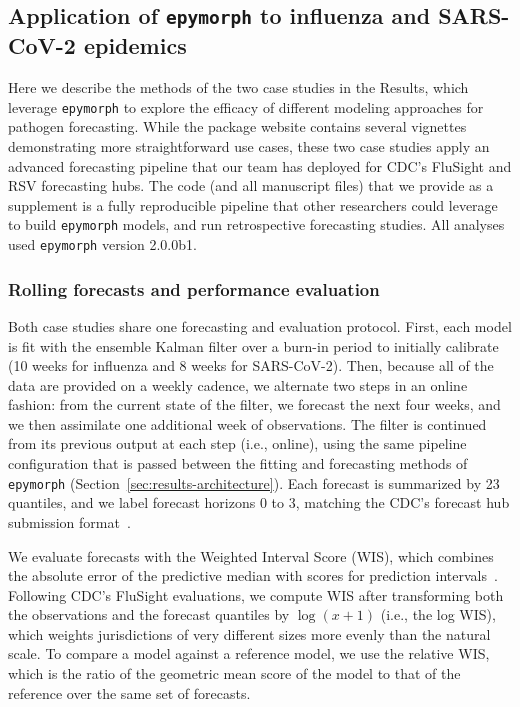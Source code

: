 \subsection{Application of \texttt{epymorph} to influenza and SARS-CoV-2 epidemics}\label{sec:methods-application}

Here we describe the methods of the two case studies in the Results, which leverage \texttt{epymorph} to explore the efficacy of different modeling approaches for pathogen forecasting. 
While the package website contains several vignettes demonstrating more straightforward use cases, these two case studies apply an advanced forecasting pipeline that our team has deployed for CDC's FluSight and RSV forecasting hubs. 
The code (and all manuscript files) that we provide as a supplement is a fully reproducible pipeline that other researchers could leverage to build \texttt{epymorph} models, and run retrospective forecasting studies. 
All analyses used \texttt{epymorph} version 2.0.0b1.

\subsubsection{Rolling forecasts and performance evaluation}

Both case studies share one forecasting and evaluation protocol. 
First, each model is fit with the ensemble Kalman filter over a burn-in period to initially calibrate (10 weeks for influenza and 8 weeks for SARS-CoV-2). 
Then, because all of the data are provided on a weekly cadence, we alternate two steps in an online fashion: from the current state of the filter, we forecast the next four weeks, and we then assimilate one additional week of observations. 
The filter is continued from its previous output at each step (i.e., online), using the same pipeline configuration that is passed between the fitting and forecasting methods of \texttt{epymorph} (Section~\ref{sec:results-architecture}). 
Each forecast is summarized by 23 quantiles, and we label forecast horizons 0 to 3, matching the CDC's forecast hub submission format~\citep{cdc_flusight_2026}.

We evaluate forecasts with the Weighted Interval Score (WIS), which combines the absolute error of the predictive median with scores for prediction intervals~\citep{bracher_evaluating_2021}. 
Following CDC's FluSight evaluations, we compute WIS after transforming both the observations and the forecast quantiles by $\log(x+1)$ (i.e., the log WIS), which weights jurisdictions of very different sizes more evenly than the natural scale. 
To compare a model against a reference model, we use the relative WIS, which is the ratio of the geometric mean score of the model to that of the reference over the same set of forecasts. 

